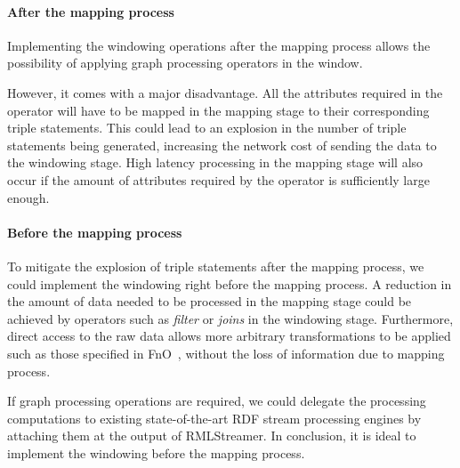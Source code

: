 \paragraph{After the mapping process}%
Implementing the windowing operations after the mapping process allows the 
possibility of applying graph processing operators in the window.  

However, it comes with a major disadvantage. All the attributes required in the operator 
will have to be mapped in the mapping stage to their corresponding triple statements. 
This could lead to an explosion in the number of triple statements being generated, increasing 
the network cost of sending the data to the windowing stage. High latency processing in 
the mapping stage will also occur if the amount of attributes required by 
the operator is sufficiently large enough. 


\paragraph{Before the mapping process}%
\label{par:Before the mapping process}
To mitigate the explosion of triple statements after the mapping process, we could implement 
the windowing right before the mapping process. A reduction in the amount of 
data needed to be processed in the mapping stage could be achieved by operators 
such as \emph{filter} or \emph{joins} in the windowing stage. Furthermore, direct 
access to the raw data allows more arbitrary transformations to be applied such as 
those specified in FnO~\cite{fno_ben}, without the loss of 
information due to mapping process. 

If graph processing operations are required, we could delegate the processing computations to 
existing state-of-the-art RDF stream processing engines by attaching them at the output of 
RMLStreamer. In conclusion, it is ideal to implement the windowing before the mapping process. 


